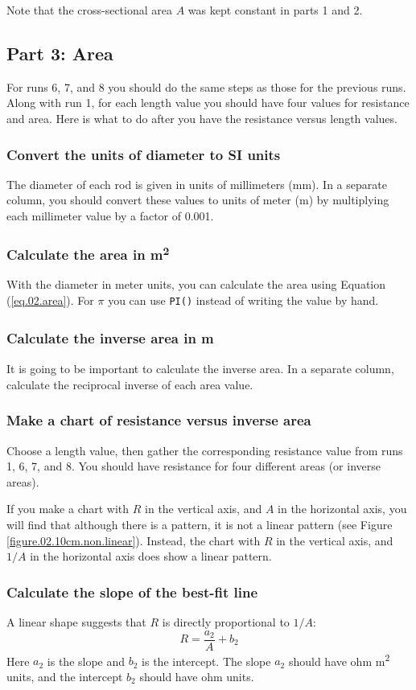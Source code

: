 Note that the cross-sectional area $A$ was kept constant in parts 1 and 2.
%
\subsection{Part 3: Area}
%
For runs 6, 7, and 8 you should do the same steps as those for the previous runs. Along with run 1, for each length value you should have four values for resistance and area. Here is what to do after you have the resistance versus length values.
%
\subsubsection{Convert the units of diameter to SI units}
%
The diameter of each rod is given in units of millimeters (mm). In a separate column, you should convert these values to units of meter (m) by multiplying each millimeter value by a factor of 0.001.
%
\subsubsection{Calculate the area in m\textsuperscript{2}}
%
With the diameter in meter units, you can calculate the area using Equation (\ref{eq.02.area}). For $\pi$ you can use \texttt{PI()} instead of writing the value by hand.
%
\subsubsection{Calculate the inverse area in m\textsuperscript{}}
%
It is going to be important to calculate the inverse area. In a separate column, calculate the reciprocal inverse of each area value.
%
\subsubsection{Make a chart of resistance versus inverse area}
%
Choose a length value, then gather the corresponding resistance value from runs 1, 6, 7, and 8. You should have resistance for four different areas (or inverse areas).

If you make a chart with $R$ in the vertical axis, and $A$ in the horizontal axis, you will find that although there is a pattern, it is not a linear pattern (see Figure \ref{figure.02.10cm.non.linear}). Instead, the chart with $R$ in the vertical axis, and $1/A$ in the horizontal axis does show a linear pattern.
%
\subsubsection{Calculate the slope of the best-fit line}
%
A linear shape suggests that $R$ is directly proportional to $1/A$:
\begin{equation}
	R = \frac{a_{2}}{A} + b_{2}
\end{equation}
Here $a_{2}$ is the slope and $b_{2}$ is the intercept. The slope $a_{2}$ should have ohm {\textperiodcentered} m\textsuperscript{2} units, and the intercept $b_{2}$ should have ohm units.

